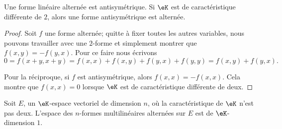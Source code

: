\begin{lemma}   \label{LemHiHNey}
    Une forme linéaire alternée est antisymétrique. Si \( \eK\) est de caractéristique différente de \( 2\), alors une forme antisymétrique est alternée.
\end{lemma}

\begin{proof}
    Soit \( f\) une forme alternée; quitte à fixer toutes les autres variables, nous pouvons travailler avec une \( 2\)-forme et simplement montrer que \( f(x,y)=-f(y,x)\). Pour ce faire nous écrivons
    \begin{equation}
        0=f(x+y,x+y)=f(x,x)+f(x,y)+f(y,x)+f(y,y)=f(x,y)+f(y,x).
    \end{equation}
    
    Pour la réciproque, si \( f\) est antisymétrique, alors \( f(x,x)=-f(x,x)\). Cela montre que \( f(x,x)=0\) lorsque \( \eK\) est de caractéristique différente de deux.
\end{proof}

\begin{proposition} \label{ProprbjihK}
    Soit \( E\), un \( \eK\)-espace vectoriel de dimension \( n\), où la caractéristique de \( \eK\) n'est pas deux. L'espace des \( n\)-formes multilinéaires alternées sur \( E\) est de \( \eK\)-dimension \( 1\).
\end{proposition}


